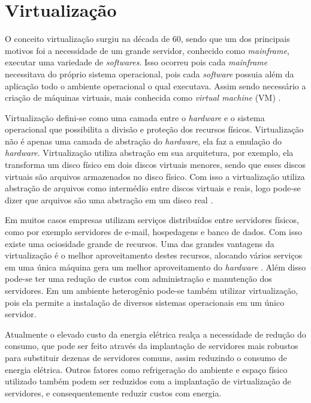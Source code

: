 \chapter{Virtualização}
O conceito virtualização surgiu na década de 60, sendo que um dos principais motivos foi a necessidade de um grande servidor,
conhecido como \textit{mainframe}, executar uma variedade de \textit{softwares}. Isso ocorreu pois cada \textit{mainframe} necessitava
do próprio sistema operacional, pois cada \textit{software} possuia além da aplicação todo o ambiente operacional o qual executava. Assim
sendo necessário a criação de máquinas virtuais, mais conhecida como \textit{virtual machine} (VM) \cite{carissimi2008}.

Virtualização defini-se como uma camada entre o \textit{hardware} e o sistema operacional que possibilita a divisão e proteção
dos recursos físicos. Virtualização não é apenas uma camada de abstração do \textit{hardware}, ela faz a emulação do \textit{hardware}.
Virtualização utiliza abstração em sua arquitetura, por exemplo, ela transforma um disco físico em dois discos virtuais menores, 
sendo que esses discos virtuais são arquivos armazenados no disco físico. Com isso a virtualização utiliza abstração de arquivos como 
intermédio entre discos virtuais e reais, logo pode-se dizer que arquivos são uma abstração em um disco real \cite{smithenair2005}. 

Em muitos casos empresas utilizam serviços distribuídos entre servidores físicos, como por exemplo servidores de e-mail, hospedagens e 
banco de dados. Com isso existe uma ociosidade grande de recursos. Uma das grandes vantagens da virtualização é o melhor aproveitamento
destes recursos, alocando vários serviços em uma única máquina gera um melhor aproveitamento do \textit{hardware} \cite{moreira2006}.
Além disso pode-se ter uma redução de custos com administração e manutenção dos servidores. Em um ambiente heterogênio pode-se também
utilizar virtualização, pois ela permite a instalação de diversos sistemas operacionais em um único servidor.

Atualmente o elevado custo da energia elétrica realça a necessidade de redução do consumo, que pode ser feito através da implantação 
de servidores mais robustos para substituir dezenas de servidores comuns, assim reduzindo o consumo de energia elétrica. 
Outros fatores como refrigeração do ambiente e espaço físico utilizado também podem ser reduzidos com a implantação de virtualização de
servidores, e consequentemente reduzir custos com energia.

